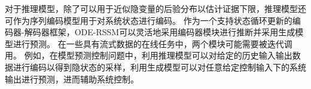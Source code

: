 对于推理模型，除了可以用于近似隐变量的后验分布以估计证据下限，推理模型还可作为序列编码模型用于对系统状态进行编码。
作为一个支持状态循环更新的编码器-解码器框架，ODE-RSSM可以灵活地采用编码器模块进行推断并采用生成模型进行预测。
在一些具有流式数据的在线任务中，两个模块可能需要被迭代调用。
例如，在模型预测控制问题中，利用推理模型可以对给定的历史输入输出数据进行编码以得到隐状态的采样，利用生成模型可以对任意给定控制输入下的系统输出进行预测，进而辅助系统控制。








